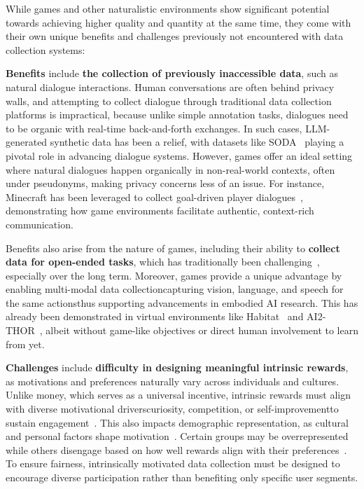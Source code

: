 While games and other naturalistic environments show significant potential towards achieving higher quality and quantity at the same time, they come with their own unique benefits and challenges previously not encountered with data collection systems:

\textbf{Benefits} include \textbf{the collection of previously inaccessible data}, such as natural dialogue interactions. Human conversations are often behind privacy walls, and attempting to collect dialogue through traditional data collection platforms is impractical, because unlike simple annotation tasks, dialogues need to be organic with real-time back-and-forth exchanges. In such cases, LLM-generated synthetic data has been a relief, with datasets like SODA~\cite{kim2022soda} playing a pivotal role in advancing dialogue systems. However, games offer an ideal setting where natural dialogues happen organically in non-real-world contexts, often under pseudonyms, making privacy concerns less of an issue. For instance, Minecraft has been leveraged to collect goal-driven player dialogues~\cite{narayan2019collaborative}, demonstrating how game environments facilitate authentic, context-rich communication.

Benefits also arise from the nature of games, including their ability to \textbf{collect data for open-ended tasks}, which has traditionally been challenging~\cite{karpinska2021perils}, especially over the long term. Moreover, games provide a unique advantage by enabling multi-modal data collection\textemdash{}capturing vision, language, and speech for the same actions\textemdash{}thus supporting advancements in embodied AI research. This has already been demonstrated in virtual environments like Habitat~\cite{puig2023habitat} and AI2-THOR~\cite{kolve2017ai2}, albeit without game-like objectives or direct human involvement to learn from yet.


\textbf{Challenges} include \textbf{difficulty in designing meaningful intrinsic rewards}, as motivations and preferences naturally vary across individuals and cultures. Unlike money, which serves as a universal incentive, intrinsic rewards must align with diverse motivational drivers\textemdash{}curiosity, competition, or self-improvement\textemdash{}to sustain engagement~\cite{jun2017types}. This also impacts demographic representation, as cultural and personal factors shape motivation~\cite{deci1985self}. Certain groups may be overrepresented while others disengage based on how well rewards align with their preferences~\cite{triandis1995individualism}. To ensure fairness, intrinsically motivated data collection must be designed to encourage diverse participation rather than benefiting only specific user segments. 

